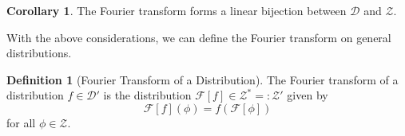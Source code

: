 \documentclass[]{article}
\theoremstyle{definition}
\newtheorem{corollary}{Corollary}[theorem]
\theoremstyle{definition}
\newtheorem{definition}{Definition}[section]
\begin{document}
\begin{corollary}
  The Fourier transform forms a linear 
  bijection between \(\mathcal{D}\) and \(\mathcal{Z}\).
\end{corollary}

With the above considerations, we can define the Fourier transform on 
general distributions.

\begin{definition}[Fourier Transform of a Distribution]
  The Fourier transform of a distribution \(f \in \mathcal{D}'\) is the 
  distribution \(\mathcal{F}[f] \in \mathcal{Z}^* =: \mathcal{Z}'\) given by 
  \[\mathcal{F}[f](\phi) = f(\mathcal{F}[\phi])\]
  for all \(\phi \in \mathcal{Z}\).
\end{definition}
\end{document}
